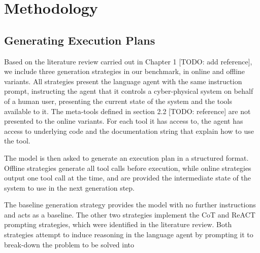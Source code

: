 \section{Methodology}

\subsection{Generating Execution Plans}

Based on the literature review carried out in Chapter 1 [TODO: add reference], we include three generation strategies in our benchmark, in online and offline variants. All strategies present the language agent with the same instruction prompt, instructing the agent that it controls a cyber-physical system on behalf of a human user, presenting the current state of the system and the tools available to it. The meta-tools defined in section 2.2 [TODO: reference] are not presented to the online variants. For each tool it has access to, the agent has access to underlying code and the documentation string that explain how to use the tool.

\pskip

The model is then asked to generate an execution plan in a structured format. Offline strategies generate all tool calls before execution, while online strategies output one tool call at the time, and are provided the intermediate state of the system to use in the next generation step.

\pskip

The baseline generation strategy provides the model with no further instructions and acts as a baseline. The other two strategies implement the CoT and ReACT prompting strategies, which were identified in the literature review. Both strategies attempt to induce reasoning in the language agent by prompting it to break-down the problem to be solved into 
